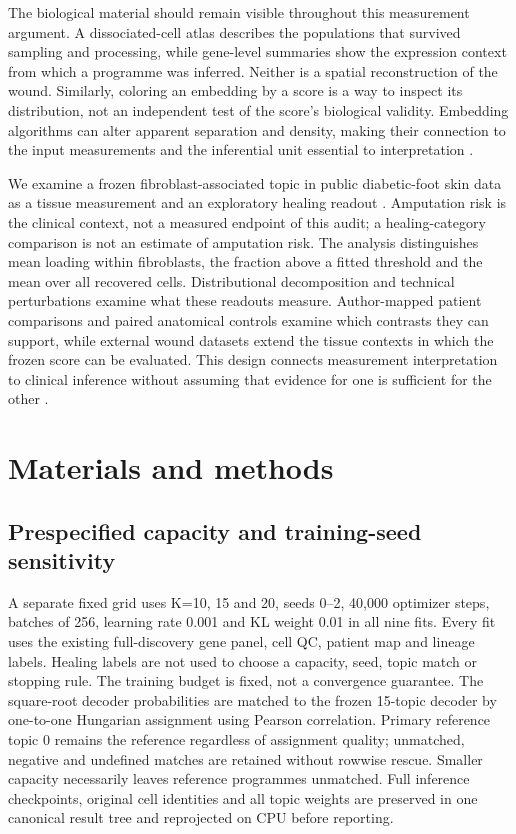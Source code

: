 \documentclass[10pt,a4paper]{article}
\begin{document}
The biological material should remain visible throughout this measurement argument. A dissociated-cell atlas describes the populations that survived sampling and processing, while gene-level summaries show the expression context from which a programme was inferred. Neither is a spatial reconstruction of the wound. Similarly, coloring an embedding by a score is a way to inspect its distribution, not an independent test of the score's biological validity. Embedding algorithms can alter apparent separation and density, making their connection to the input measurements and the inferential unit essential to interpretation \citep{becht2019,huang2022visualization}.

We examine a frozen fibroblast-associated topic in public diabetic-foot skin data as a tissue measurement and an exploratory healing readout \citep{theocharidis2022,cronbach1955}. Amputation risk is the clinical context, not a measured endpoint of this audit; a healing-category comparison is not an estimate of amputation risk. The analysis distinguishes mean loading within fibroblasts, the fraction above a fitted threshold and the mean over all recovered cells. Distributional decomposition and technical perturbations examine what these readouts measure. Author-mapped patient comparisons and paired anatomical controls examine which contrasts they can support, while external wound datasets extend the tissue contexts in which the frozen score can be evaluated. This design connects measurement interpretation to clinical inference without assuming that evidence for one is sufficient for the other \citep{collins2015}.

\section{Materials and methods}
\subsection{Prespecified capacity and training-seed sensitivity}
A separate fixed grid uses K=10, 15 and 20, seeds 0--2, 40,000 optimizer steps, batches of 256, learning rate 0.001 and KL weight 0.01 in all nine fits. Every fit uses the existing full-discovery gene panel, cell QC, patient map and lineage labels. Healing labels are not used to choose a capacity, seed, topic match or stopping rule. The training budget is fixed, not a convergence guarantee. The square-root decoder probabilities are matched to the frozen 15-topic decoder by one-to-one Hungarian assignment using Pearson correlation. Primary reference topic 0 remains the reference regardless of assignment quality; unmatched, negative and undefined matches are retained without rowwise rescue. Smaller capacity necessarily leaves reference programmes unmatched. Full inference checkpoints, original cell identities and all topic weights are preserved in one canonical result tree and reprojected on CPU before reporting.
\end{document}
